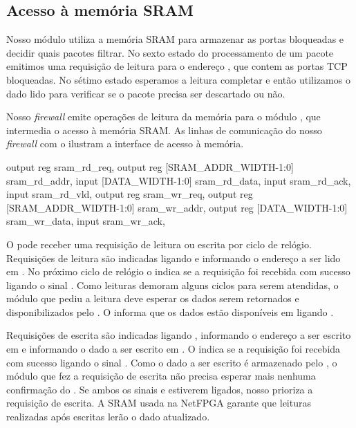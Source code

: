 \subsection{Acesso à memória SRAM}
\label{sec:impl.mem}

Nosso módulo utiliza a memória SRAM para armazenar as portas
bloqueadas e decidir quais pacotes filtrar.  No sexto estado do
processamento de um pacote emitimos uma requisição de leitura para o
endereço , que contem as portas TCP
bloqueadas.  No sétimo estado esperamos a leitura completar e então
utilizamos o dado lido para verificar se o pacote precisa ser
descartado ou não.

Nosso \emph{firewall} emite operações de leitura da memória para o
módulo , que intermedia o acesso à memória SRAM.
As linhas de comunicação do nosso \emph{firewall} com o
 ilustram a interface de acesso à memória.

\begin{verilogcode}
      output reg                       sram_rd_req,
      output reg [SRAM_ADDR_WIDTH-1:0] sram_rd_addr,
      input [DATA_WIDTH-1:0]           sram_rd_data,
      input                            sram_rd_ack,
      input                            sram_rd_vld,
      output reg                       sram_wr_req,
      output reg [SRAM_ADDR_WIDTH-1:0] sram_wr_addr,
      output reg [DATA_WIDTH-1:0]      sram_wr_data,
      input                            sram_wr_ack,
\end{verilogcode}

O  pode receber uma requisição de leitura ou
escrita por ciclo de relógio.  Requisições de leitura são indicadas
ligando  e informando o endereço a ser lido em
.  No próximo ciclo de relógio o
 indica se a requisição foi recebida com sucesso
ligando o sinal .  Como leituras demoram alguns
ciclos para serem atendidas, o módulo que pediu a leitura deve
esperar os dados serem retornados e disponibilizados pelo
.  O  informa que os dados
estão disponíveis em  ligando
.

Requisições de escrita são indicadas ligando ,
informando o endereço a ser escrito em  e
informando o dado a ser escrito em .  O
 indica se a requisição foi recebida com sucesso
ligando o sinal .  Como o dado a ser escrito é
armazenado pelo , o módulo que fez a requisição
de escrita não precisa esperar mais nenhuma confirmação do
.  Se ambos os sinais  e
 estiverem ligados, nosso 
prioriza a requisição de escrita.  A SRAM usada na NetFPGA garante
que leituras realizadas após escritas lerão o dado atualizado.

